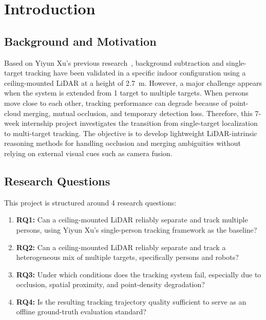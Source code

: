 \documentclass[11pt,a4paper]{report}
\begin{document}
\newpage
\tableofcontents
\newpage


\chapter{Introduction}

\section*{Background and Motivation}
Based on Yiyun Xu's previous research~\cite{xu2026indoorlocalization}, background subtraction and single-target tracking have been validated in a specific indoor configuration using a ceiling-mounted LiDAR at a height of 2.7~m. However, a major challenge appears when the system is extended from 1 target to multiple targets. When persons move close to each other, tracking performance can degrade because of point-cloud merging, mutual occlusion, and temporary detection loss. Therefore, this 7-week internship project investigates the transition from single-target localization to multi-target tracking. The objective is to develop lightweight LiDAR-intrinsic reasoning methods for handling occlusion and merging ambiguities without relying on external visual cues such as camera fusion.

\section*{Research Questions}
This project is structured around 4 research questions:

\begin{enumerate}[leftmargin=*]
    \item \textbf{RQ1:} Can a ceiling-mounted LiDAR reliably separate and track multiple persons, using Yiyun Xu's single-person tracking framework as the baseline?
    \item \textbf{RQ2:} Can a ceiling-mounted LiDAR reliably separate and track a heterogeneous mix of multiple targets, specifically persons and robots?
    \item \textbf{RQ3:} Under which conditions does the tracking system fail, especially due to occlusion, spatial proximity, and point-density degradation?
    \item \textbf{RQ4:} Is the resulting tracking trajectory quality sufficient to serve as an offline ground-truth evaluation standard?
\end{enumerate}
\end{document}
